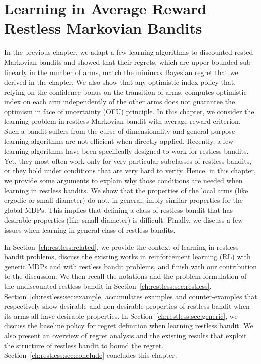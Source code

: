 \begingroup
\let\clearpage\relax

\chapter{Learning in Average Reward Restless Markovian Bandits}
\label{ch:learning_restless}


In the previous chapter, we adapt a few learning algorithms to discounted rested Markovian bandits and showed that their regrets, which are upper bounded sub-linearly in the number of arms, match the minimax Bayesian regret that we derived in the chapter.
We also show that any optimistic index policy that, relying on the confidence bonus on the transition of arms, computes optimistic index on each arm independently of the other arms does not guarantee the optimism in face of uncertainty (OFU) principle.
In this chapter, we consider the learning problem in restless Markovian bandit with average reward criterion.
Such a bandit suffers from the curse of dimensionality and general-purpose learning algorithms are not efficient when directly applied. Recently, a few learning algorithms have been specifically designed to work for restless bandits. Yet, they most often work only for very particular subclasses of restless bandits, or they hold under conditions that are very hard to verify.
Hence, in this chapter, we provide some arguments to explain why those conditions are needed when learning in restless bandits. We show that the properties of the local arms (like ergodic or small diameter) do not, in general, imply similar properties for the global MDPs. This implies that defining a class of restless bandit that has desirable properties (like small diameter) is difficult. 
Finally, we discuss a few issues when learning in general class of restless bandits.

In Section~\ref{ch:restless:related}, we provide the context of learning in restless bandit problems, discuss the existing works in reinforcement learning (RL) with generic MDPs and with restless bandit problems, and finish with our contribution to the discussion.
We then recall the notations and the problem formulation of the undiscounted restless bandit in Section~\ref{ch:restless:sec:restless}.
Section~\ref{ch:restless:sec:example} accumulates examples and counter-examples that respectively show desirable and non-desirable properties of restless bandit when its arms all have desirable properties.
In Section~\ref{ch:restless:sec:generic}, we discuss the baseline policy for regret definition when learning restless bandit.
We also present an overview of regret analysis and the existing results that exploit the structure of restless bandit to bound the regret.
Section~\ref{ch:restless:sec:conclude} concludes this chapter.

